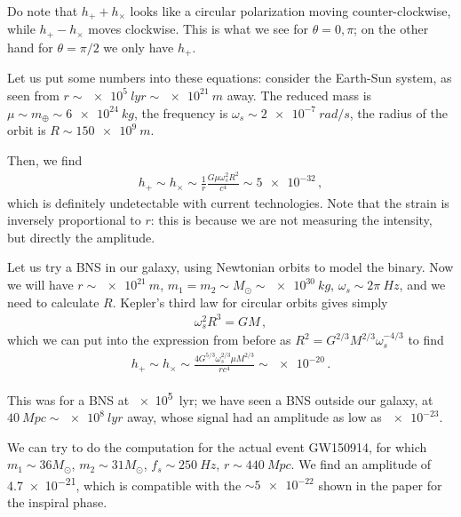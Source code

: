 \documentclass[main.tex]{subfiles}
\begin{document}
Do note that \(h_{+} + h_{ \times }\) looks like a circular polarization moving counter-clockwise, while \(h_{+} - h_{ \times }\) moves clockwise. This is what we see for \(\theta = 0, \pi \); on the other hand for \(\theta = \pi /2\) we only have \(h_{+}\). 


Let us put some numbers into these equations: consider the Earth-Sun system, as seen from \(r \sim\SI{e5}{lyr} \sim \SI{e21}{m}\) away. The reduced mass is \(\mu \sim m_{\oplus} \sim \SI{6e24}{kg}\), the frequency is \(\omega_{s} \sim \SI{2e-7}{rad/s}\), the radius of the orbit is \(R \sim \SI{150e9}{m}\).

Then, we find 
%
\begin{align}
h_+ \sim h_{ \times } \sim \frac{1}{r}
\frac{G \mu \omega_{s}^2 R^2}{c^{4}} 
\sim \num{5e-32}
\,,
\end{align}
%
which is definitely undetectable with current technologies. 
Note that the strain is inversely proportional to \(r\): this is because we are not measuring the intensity, but directly the amplitude. 

Let us try a BNS in our galaxy, using Newtonian orbits to model the binary.
Now we will have \(r \sim \SI{e21}{m}\), \(m_1 = m_2 \sim M_{\odot} \sim \SI{e30}{kg}\), \(\omega_{s} \sim 2 \pi \SI{}{Hz}\), and we need to calculate \(R\).
Kepler's third law for circular orbits gives simply 
%
\begin{align}
\omega_{s}^2 R^3 = GM
\,,
\end{align}
%
which we can put into the expression from before as \(R^2 = G^{2/3} M^{2/3} \omega_{s}^{-4/3}\) to find 
%
\begin{align}
h_{+} \sim h_{ \times } \sim \frac{4 G^{5/3} \omega_{s}^{2/3} \mu M^{2/3}}{r c^{4}} \sim \num{e-20}
\,.
\end{align}


This was for a BNS at \SI{e5}{lyr};
we have seen a BNS outside our galaxy, at \(\SI{40}{Mpc} \sim \SI{e8}{lyr}\) away, whose signal had an amplitude as low as \(\num{e-23}\). 

We can try to do the computation for the actual event GW150914, for which \(m_1 \sim 36 M_{\odot}\), \(m_2 \sim 31 M_{\odot}\), \(f_s \sim \SI{250}{Hz}\), \(r \sim \SI{440}{Mpc}\). 
We find an amplitude of \num{4.7e-21}, which is compatible with the \(\sim \num{5e-22}\) shown in the paper \cite[fig.\ 2]{ligoscientificcollaborationandvirgocollaborationObservationGravitationalWaves2016} for the inspiral phase.
\end{document}
